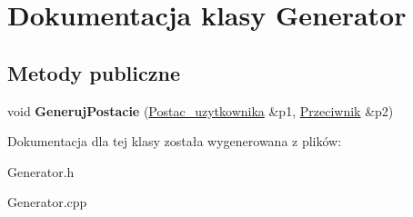 \hypertarget{class_generator}{}\section{Dokumentacja klasy Generator}
\label{class_generator}
\subsection*{Metody publiczne}
\begin{DoxyCompactItemize}
\item 
void {\bfseries Generuj\+Postacie} (\hyperlink{class_postac__uzytkownika}{Postac\+\_\+uzytkownika} \&p1, \hyperlink{class_przeciwnik}{Przeciwnik} \&p2)\hypertarget{class_generator_ad19b0b8c4736de13184492b1f8c7774e}{}\label{class_generator_ad19b0b8c4736de13184492b1f8c7774e}

\end{DoxyCompactItemize}


Dokumentacja dla tej klasy została wygenerowana z plików\+:\begin{DoxyCompactItemize}
\item 
Generator.\+h\item 
Generator.\+cpp\end{DoxyCompactItemize}
